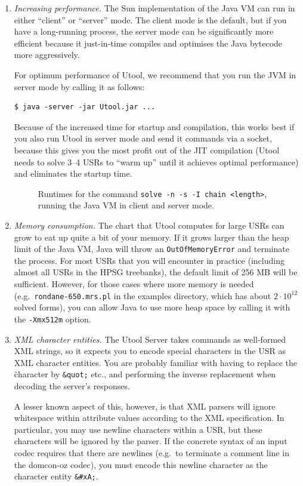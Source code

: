 \begin{enumerate}
\item \textit{Increasing performance.} The Sun implementation of the
Java VM can run in either ``client'' or ``server'' mode. The client
mode is the default, but if you have a long-running process, the
server mode can be significantly more efficient because it
just-in-time compiles and optimises the Java bytecode more
aggressively.

For optimum performance of Utool, we recommend that you run the JVM in
server mode by calling it as follows:
\begin{verbatim}
$ java -server -jar Utool.jar ...
\end{verbatim}

Because of the increased time for startup and compilation, this works
best if you also run Utool in server mode and send it commands via a
socket, because this gives you the most profit out of the JIT
compilation (Utool needs to solve 3--4 USRs to ``warm up'' until it
achieves optimal performance) and eliminates the startup time.

\begin{figure}
\begin{center}
\end{center}
\caption{Runtimes for the command \texttt{solve -n -s -I chain
<length>}, running the Java VM in client and server
mode. \label{fig:chains-server-client}}
\end{figure}


\item \textit{Memory consumption.} The chart that Utool computes for
large USRs can grow to eat up quite a bit of your memory. If it grows
larger than the heap limit of the Java VM, Java will throw an
\verb?OutOfMemoryError? and terminate the process. For most USRs that
you will encounter in practice (including almost all USRs in the HPSG
treebanks), the default limit of 256 MB will be sufficient. However,
for those cases where more memory is needed (e.g.\
\verb?rondane-650.mrs.pl? in the examples directory, which has about
$2 \cdot 10^{12}$ solved forms), you can allow Java to use more heap
space by calling it with the \verb?-Xmx512m? option.

\item \textit{XML character entities.} The Utool Server takes commands
as well-formed XML strings, so it expects you to encode special
characters in the USR as XML character entities. You are probably
familiar with having to replace the \" character by \verb?&quot;?
etc., and performing the inverse replacement when decoding the
server's responses.

A lesser known aspect of this, however, is that XML parsers will
ignore whitespace within attribute values according to the XML
specification. In particular, you may use newline characters within a
USR, but these characters will be ignored by the parser. If the
concrete syntax of an input codec requires that there are newlines
(e.g.\ to terminate a comment line in the domcon-oz codec), you must
encode this newline character as the character entity \verb?&#xA;?.
\end{enumerate}



